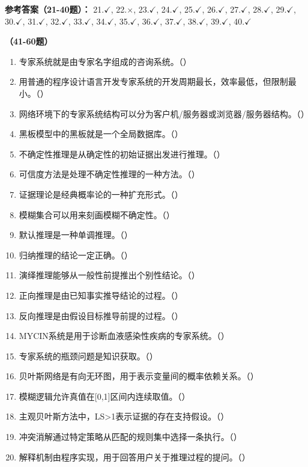 \textbf{参考答案（21-40题）：}
21.$\checkmark$, 22.$\times$, 23.$\checkmark$, 24.$\checkmark$, 25.$\checkmark$, 26.$\checkmark$, 27.$\checkmark$, 28.$\checkmark$, 29.$\checkmark$, 30.$\checkmark$, 
31.$\checkmark$, 32.$\checkmark$, 33.$\checkmark$, 34.$\checkmark$, 35.$\checkmark$, 36.$\checkmark$, 37.$\checkmark$, 38.$\checkmark$, 39.$\checkmark$, 40.$\checkmark$

\vspace{1em}
\textbf{（41-60题）}
\begin{enumerate}[resume,leftmargin=2em,itemsep=1pt]
\item 专家系统就是由专家名字组成的咨询系统。（\quad）
\item 用普通的程序设计语言开发专家系统的开发周期最长，效率最低，但限制最小。（\quad）
\item 网络环境下的专家系统结构可以分为客户机/服务器或浏览器/服务器结构。（\quad）
\item 黑板模型中的黑板就是一个全局数据库。（\quad）
\item 不确定性推理是从确定性的初始证据出发进行推理。（\quad）
\item 可信度方法是处理不确定性推理的一种方法。（\quad）
\item 证据理论是经典概率论的一种扩充形式。（\quad）
\item 模糊集合可以用来刻画模糊不确定性。（\quad）
\item 默认推理是一种单调推理。（\quad）
\item 归纳推理的结论一定正确。（\quad）
\item 演绎推理能够从一般性前提推出个别性结论。（\quad）
\item 正向推理是由已知事实推导结论的过程。（\quad）
\item 反向推理是由假设目标推导前提的过程。（\quad）
\item MYCIN系统是用于诊断血液感染性疾病的专家系统。（\quad）
\item 专家系统的瓶颈问题是知识获取。（\quad）
\item 贝叶斯网络是有向无环图，用于表示变量间的概率依赖关系。（\quad）
\item 模糊逻辑允许真值在[0,1]区间内连续取值。（\quad）
\item 主观贝叶斯方法中，LS>1表示证据的存在支持假设。（\quad）
\item 冲突消解通过特定策略从匹配的规则集中选择一条执行。（\quad）
\item 解释机制由程序实现，用于回答用户关于推理过程的提问。（\quad）
\end{enumerate}


